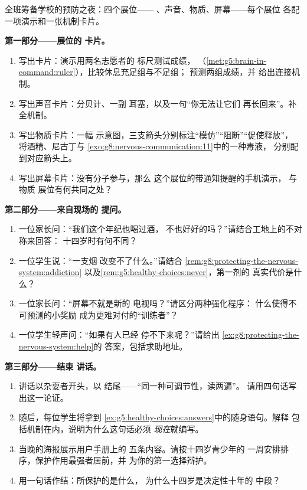 \begin{problem}\label{pb:g8:protecting-the-nervous-system:1}
全班筹备学校的预防之夜：四个展位——
、声音、物质、屏幕——每个展位
各配一项演示和一张机制卡片。

\medskip\noindent\textbf{第一部分——展位的
卡片。}
\begin{enumerate}
  \item 写出卡片：演示用两名志愿者的
        标尺测试成绩，
        （\cref{met:g5:brain-in-command:ruler}），比较休息充足组与不足组；
        预测两组成绩，并
        给出连接机制。
  \item 写出声音卡片：分贝计、一副
        耳塞，以及一句“你无法让它们
        再长回来”。补全机制。
  \item 写出物质卡片：一幅
        示意图，三支箭头分别标注“模仿”“阻断”“促使释放”，
        将酒精、尼古丁与
        \cref{exo:g8:nervous-communication:11}中的一种毒液，
        分别配到对应箭头上。
  \item 写出屏幕卡片：没有分子参与，那么
        这个展位的带通知提醒的手机演示，
        与物质
        展位有何共同之处？
\end{enumerate}

\medskip\noindent\textbf{第二部分——来自现场的
提问。}
\begin{enumerate}[resume]
  \item 一位家长问：“我们这个年纪也喝过酒，
        不也好好的吗？”请结合工地上的不对称来回答：
        十四岁时有何不同？
  \item 一位学生说：“一支烟
        改变不了什么。”请结合
        \cref{rem:g8:protecting-the-nervous-system:addiction}
        以及\cref{rem:g5:healthy-choices:never}，第一剂的
        真实代价是什么？
  \item 一位家长问：“屏幕不就是新的
        电视吗？”请区分两种强化程序：
        什么使得不可预测的小奖励
        成为更难对付的“训练者”？
  \item 一位学生轻声问：“如果有人已经
        停不下来呢？”请给出
        \cref{ex:g8:protecting-the-nervous-system:help}的
        答案，包括求助地址。
\end{enumerate}

\medskip\noindent\textbf{第三部分——结束
讲话。}
\begin{enumerate}[resume]
  \item 讲话以杂耍者开头，以
        结尾——“同一种可调节性，读两遍”。
        请用四句话写出这一论证。
  \item 随后，每位学生将拿到
        \cref{ex:g5:healthy-choices:answers}中的随身语句。解释
        包括机制在内，说明为什么这句话必须
        \emph{现在}就编写。
  \item 当晚的海报展示用户手册上的
        五条内容。请按十四岁青少年的
        一周安排排序，保护作用最强者居前，并
        为你的第一选择辩护。
  \item 用一句话作结：所保护的是什么，
        为什么十四岁是决定性十年的
        中段？
\end{enumerate}
\end{problem}

